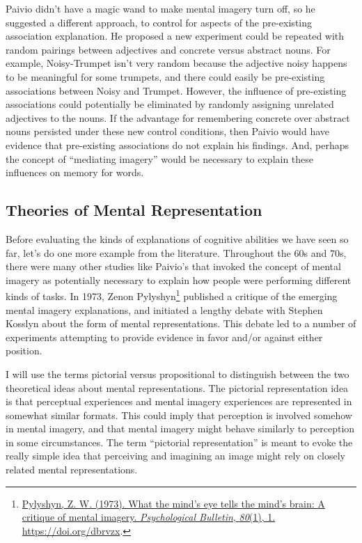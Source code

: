 \documentclass[
  oneside,
  12pt]{crumpbook}
\begin{document}
Paivio didn't have a magic wand to make mental imagery turn off, so he suggested a different approach, to control for aspects of the pre-existing association explanation. He proposed a new experiment could be repeated with random pairings between adjectives and concrete versus abstract nouns. For example, Noisy-Trumpet isn't very random because the adjective noisy happens to be meaningful for some trumpets, and there could easily be pre-existing associations between Noisy and Trumpet. However, the influence of pre-existing associations could potentially be eliminated by randomly assigning unrelated adjectives to the nouns. If the advantage for remembering concrete over abstract nouns persisted under these new control conditions, then Paivio would have evidence that pre-existing associations do not explain his findings. And, perhaps the concept of ``mediating imagery'' would be necessary to explain these influences on memory for words.

\hypertarget{theories-of-mental-representation}{%
\subsection{Theories of Mental Representation}\label{theories-of-mental-representation}}

Before evaluating the kinds of explanations of cognitive abilities we have seen so far, let's do one more example from the literature. Throughout the 60s and 70s, there were many other studies like Paivio's that invoked the concept of mental imagery as potentially necessary to explain how people were performing different kinds of tasks. In 1973, Zenon Pylyshyn\footnote{\protect\hyperlink{ref-pylyshynWhatMindEye1973}{Pylyshyn, Z. W. (1973). What the mind's eye tells the mind's brain: {A} critique of mental imagery. \emph{Psychological Bulletin}, \emph{80}(1), 1. \url{https://doi.org/dbrvzx}}.} published a critique of the emerging mental imagery explanations, and initiated a lengthy debate with Stephen Kosslyn about the form of mental representations. This debate led to a number of experiments attempting to provide evidence in favor and/or against either position.

I will use the terms pictorial versus propositional to distinguish between the two theoretical ideas about mental representations. The pictorial representation idea is that perceptual experiences and mental imagery experiences are represented in somewhat similar formats. This could imply that perception is involved somehow in mental imagery, and that mental imagery might behave similarly to perception in some circumstances. The term ``pictorial representation'' is meant to evoke the really simple idea that perceiving and imagining an image might rely on closely related mental representations.
\end{document}
